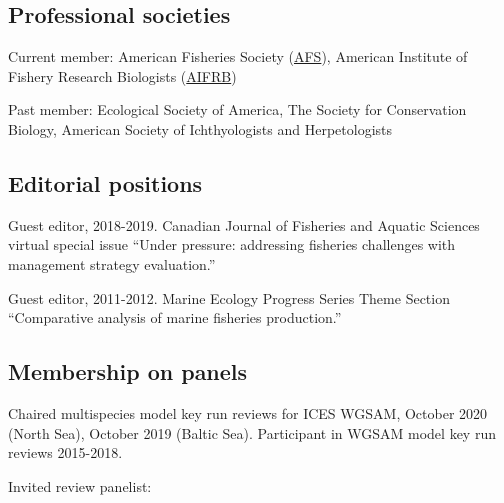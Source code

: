 \documentclass[11pt, a4paper]{awesome-cv}
\begin{document}
\hypertarget{professional-societies}{%
\subsection{Professional societies}\label{professional-societies}}

Current member: American Fisheries Society
(\href{https://fisheries.org/}{AFS}), American Institute of Fishery
Research Biologists (\href{https://www.aifrb.org/}{AIFRB})

Past member: Ecological Society of America, The Society for Conservation
Biology, American Society of Ichthyologists and Herpetologists

\hypertarget{editorial-positions}{%
\subsection{Editorial positions}\label{editorial-positions}}

Guest editor, 2018-2019. Canadian Journal of Fisheries and Aquatic
Sciences virtual special issue ``Under pressure: addressing fisheries
challenges with management strategy evaluation.''

Guest editor, 2011-2012. Marine Ecology Progress Series Theme Section
``Comparative analysis of marine fisheries production.''

\hypertarget{membership-on-panels}{%
\subsection{Membership on panels}\label{membership-on-panels}}

Chaired multispecies model key run reviews for ICES WGSAM, October 2020
(North Sea), October 2019 (Baltic Sea). Participant in WGSAM model key
run reviews 2015-2018.

Invited review panelist:
\end{document}
